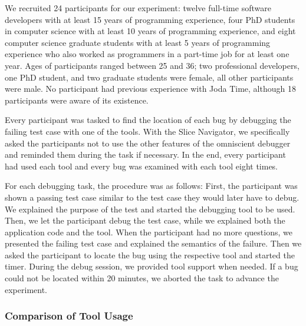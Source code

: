 \documentclass[
			english,
			review,
			]{elsarticle}
\begin{document}
We recruited 24 participants for our experiment:
twelve full-time software developers with at least 15 years of programming experience, 
four PhD students in computer science with at least 10 years of programming experience,
and eight computer science graduate students with at least 5 years of programming experience who also worked as programmers in a part-time job for at least one year.
Ages of participants ranged between 25 and 36; two professional developers, one PhD student, and two graduate students were female, all other participants were male.
No participant had previous experience with Joda Time, although 18 participants were aware of its existence.

Every participant was tasked to find the location of each bug by debugging the failing test case with one of the tools.
With the Slice Navigator, we specifically asked the participants not to use the other features of the omniscient debugger and reminded them during the task if necessary.
In the end, every participant had used each tool and every bug was examined with each tool eight times.

For each debugging task, the procedure was as follows:
First, the participant was shown a passing test case similar to the test case they would later have to debug.
We explained the purpose of the test and started the debugging tool to be used.
Then, we let the participant debug the test case, while we explained both the application code and the tool.
When the participant had no more questions, we presented the failing test case and explained the semantics of the failure.
Then we asked the participant to locate the bug using the respective tool and started the timer.
During the debug session, we provided tool support when needed.
If a bug could not be located within 20 minutes, we aborted the task to advance the experiment.

\subsubsection{Comparison of Tool Usage}
\end{document}
